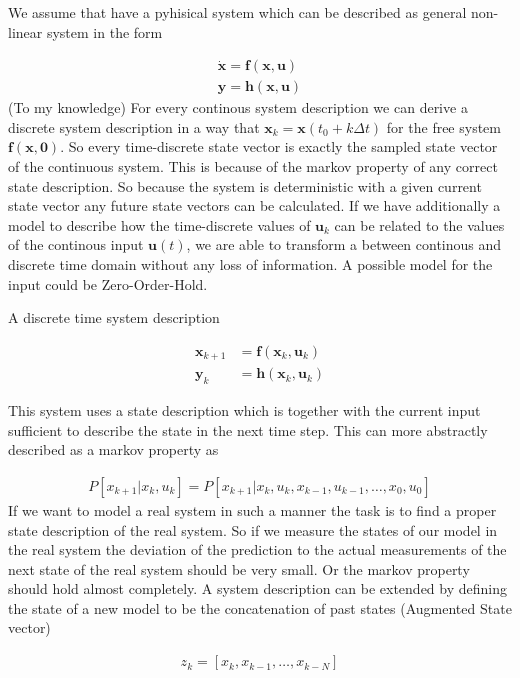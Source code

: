 \documentclass[a4paper, 10pt]{article}
\begin{document}
We assume that have a pyhisical system which can be described as general non-linear system in the form

\begin{align*}
\dot{\bm{x}}=\bm{f}(\bm{x},\bm{u}) \\
\bm{y}=\bm{h}(\bm{x},\bm{u})
\end{align*}
(To my knowledge) For every continous system description we can derive a discrete system description in a way that $\bm{x}_k=\bm{x}(t_0+k\Delta t)$ for the free system $\bm{f}(\bm{x},\bm{0})$.
So every time-discrete state vector is exactly the sampled state vector of the continuous system.
This is because of the markov property of any correct state description.
So because the system is deterministic with a given current state vector any future state vectors can be calculated.
If we have additionally a model to describe how the time-discrete values of $\bm{u}_k$ can be related to the values of the continous input $\bm{u}(t)$, we are able to transform a between continous and discrete time domain without any loss of information.
A possible model for the input could be Zero-Order-Hold.


A discrete time system description

\begin{align*}
\bm{x}_{k+1} &= \bm{f}(\bm{x}_k,\bm{u}_k)
\\
\bm{y}_{k} &= \bm{h}(\bm{x}_k, \bm{u}_k)
\end{align*}

This system uses a state description which is together with the current input sufficient to describe the state in the next time step.
This can more abstractly described as a markov property as

\begin{align*}
P[x_{k+1}|x_k,u_k] = P[x_{k+1}|x_k,u_k,x_{k-1},u_{k-1},\dots,x_0,u_0]
\end{align*}
If we want to model a real system in such a manner the task is to find a proper state description of the real system.
So if we measure the states of our model in the real system the deviation of the prediction to the actual measurements of the next state of the real system should be very small.
Or the markov property should hold almost completely.
A system description can be extended by defining the state of a new model to be the concatenation of past states (Augmented State vector)

\begin{align*}
z_k = [x_k, x_{k-1}, \dots , x_{k-N}]
\end{align*}
\end{document}
